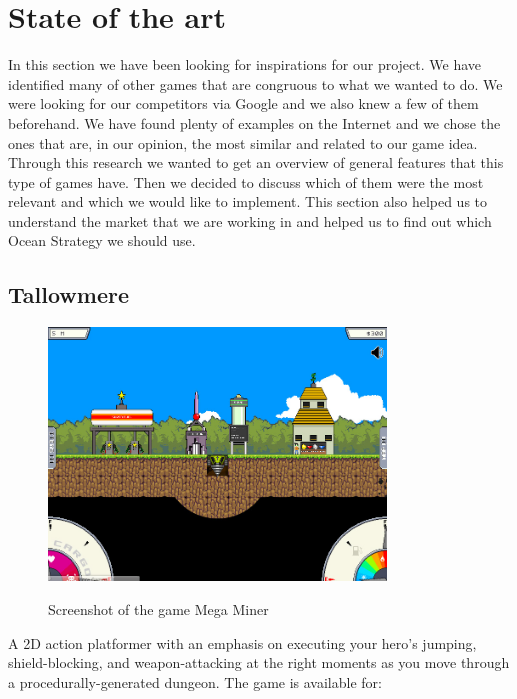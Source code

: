 \documentclass[12p]{article}
\begin{document}
\newpage
\section{State of the art}

In this section we have been looking for inspirations for our project. We have identified many of other games that are congruous to what we wanted to do.
We were looking for our competitors via Google and we also knew a few of them beforehand. We have found plenty of examples on the Internet and we chose the ones that are, in our opinion, the most similar and related to our game idea. Through this research we wanted to get an overview of general features that this type of games have. Then we decided to discuss which of them were the most relevant and which we would like to implement. This section also helped us to understand the market that we are working in and helped us to find out which Ocean Strategy we should use.


\subsection{Tallowmere} \label{StateOfTheArt_Tallowmere}

\begin{figure}[ht]
  \center
  \includegraphics[width=0.8\textwidth]{StateOfTheArtScreenshots/mega_miner}
  \label{StateOfTheArt_Screenshots_Tallowmere}
  \caption{Screenshot of the game Mega Miner \cite{MegaMinerScreenshot}}
\end{figure}

A 2D action platformer with an emphasis on executing your hero's jumping, shield-blocking, and weapon-attacking at the right moments as you move through a procedurally-generated dungeon. The game is available for:
\end{document}
